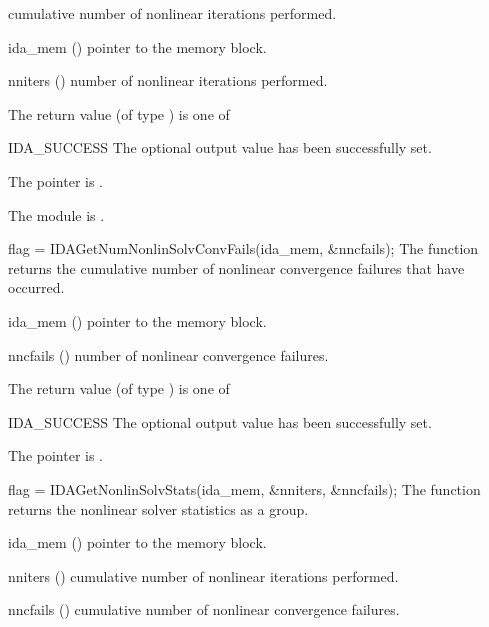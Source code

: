 {{  cumulative number of nonlinear iterations performed.
}
{
  \begin{args}[nniters]
  \item[ida\_mem] ()
    pointer to the {\idas} memory block.
  \item[nniters] ()
    number of nonlinear iterations performed.
  \end{args}
}
{
  The return value  (of type ) is one of
  \begin{args}
  \item[IDA\_SUCCESS]
    The optional output value has been successfully set.
  \item[\Id{IDA\_MEM\_NULL}]
    The  pointer is .
  \item[\Id{IDA\_MEM\_FAIL}]
    The {\sunnonlinsol} module is .
  \end{args}
}
{}
{
  flag = IDAGetNumNonlinSolvConvFails(ida\_mem, \&nncfails);
}
{
  The function  returns the
  cumulative number of nonlinear convergence failures that have occurred.
}
{
  \begin{args}[nncfails]
  \item[ida\_mem] ()
    pointer to the {\idas} memory block.
  \item[nncfails] ()
    number of nonlinear convergence failures.
  \end{args}
}
{
  The return value  (of type ) is one of
  \begin{args}
  \item[IDA\_SUCCESS]
    The optional output value has been successfully set.
  \item[\Id{IDA\_MEM\_NULL}]
    The  pointer is .
  \end{args}
}
{}
{
  flag = IDAGetNonlinSolvStats(ida\_mem, \&nniters, \&nncfails);
}
{
  The function  returns the
  {\idas} nonlinear solver statistics as a group.
}
{
  \begin{args}[nncfails]
  \item[ida\_mem] ()
    pointer to the {\idas} memory block.
  \item[nniters] ()
    cumulative number of nonlinear iterations performed.
  \item[nncfails] ()
    cumulative number of nonlinear convergence failures.

\end{args}}}
